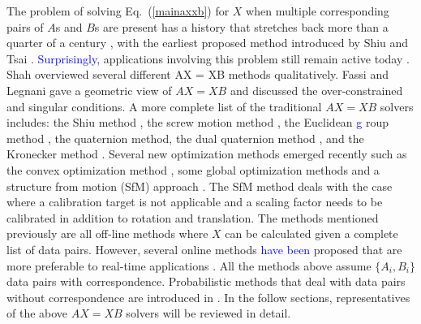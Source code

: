 \documentclass[twocolumn,10pt]{asme2ej}
\newcommand{\ttt}{{\bf t}}
\begin{document}
The problem of solving Eq.~(\ref{mainaxxb}) for $X$ when multiple corresponding pairs of $A$s and $B$s are present has a history that stretches back more than a quarter of a century
\cite{chou1991finding, park1994robot,shiu1989calibration}, with the earliest proposed method introduced by Shiu \cite{shiu1987finding, shiu1989calibration} and Tsai \cite{tsai1989new}. \textcolor{blue}{Surprisingly,} applications involving this problem still remain active today \cite{kim,dai}. Shah \cite{shah2012overview} overviewed several different AX = XB methods qualitatively. Fassi and Legnani \cite{fassi2005hand} gave a geometric view of $AX=XB$ and discussed the over-constrained and singular conditions. A more complete list of the traditional $AX=XB$ solvers includes: the Shiu method \cite{shiu1989calibration}, the screw motion method \cite{chen91,zhao2006hand}, the Euclidean \textcolor{blue}{g}%
roup method \cite{park1994robot,gwak2003numerical}, the quaternion method\cite{chou1988quaternions, chou1991finding, horaud1995hand}, the dual quaternion method \cite{daniilidis1996dual, daniilidis1999hand}, and the Kronecker method \cite{andreff1999line,andreff2001robot}. Several new optimization methods emerged recently such as the convex optimization method \cite{zhao2011hand}, some global optimization methods  \cite{seo2009branch,andreff2001robot,heller2014hand} and a structure from motion (SfM) approach \cite{schmidt2005calibration}. The SfM method deals with the case where a calibration target is not applicable and a scaling factor needs to be calibrated in addition to rotation and translation. The methods mentioned previously are all off-line methods where $X$ can be calculated given a complete list of data pairs. However, several online methods \textcolor{blue}{have been} %
proposed that are more preferable to real-time applications \cite{andreff1999line,angeles2000online,ackerman2014online}. All the methods above assume $\{A_i, B_i\}$ data pairs with correspondence. Probabilistic methods that deal with data pairs without correspondence are introduced in \cite{ackermanGSI, ackerman2014information}. In the follow sections, representatives of the above $AX=XB$ solvers will be reviewed in detail.

\end{document}
